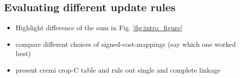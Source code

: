 


\subsection{Evaluating different update rules} \label{sec:exp_first_comparison}
\begin{itemize}
  \item Highlight difference of the sum in Fig. \ref{fig:intro_figure}
  \item compare different choices of signed-cost-mappings (say which one worked best)
  \item present cremi crop-C table and rule out single and complete linkage
\end{itemize}




